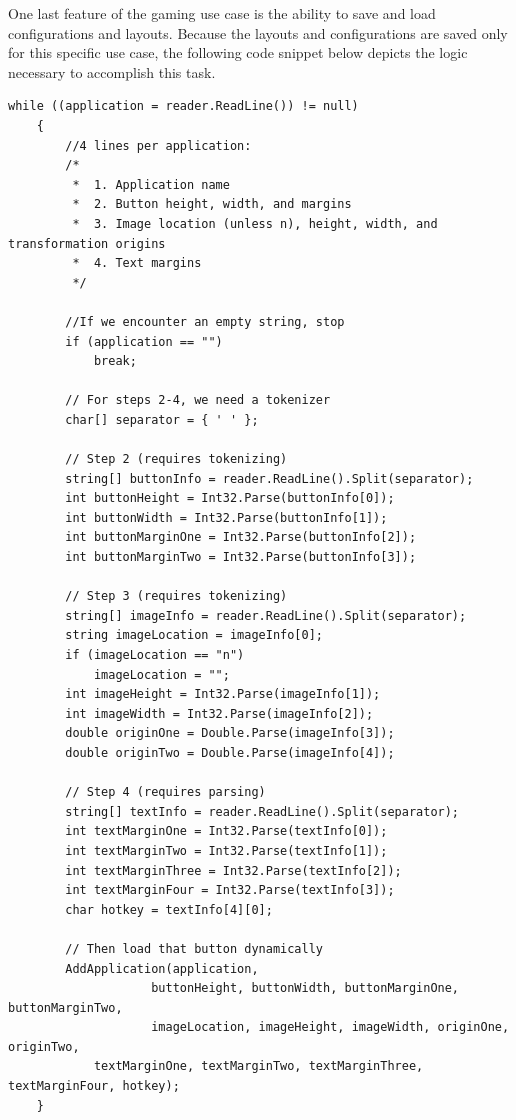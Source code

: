 \documentclass[fullpage, 10pt, onecolumn, draftclsnofoot]{IEEEtran}
\begin{document}
One last feature of the gaming use case is the ability to save and load configurations and layouts.  Because the layouts and configurations are saved only for this specific use case, the following code snippet below depicts the logic necessary to accomplish this task.\\

\lstset{style=sharpc}
\begin{lstlisting}
while ((application = reader.ReadLine()) != null)
    {
        //4 lines per application:
        /*
         *  1. Application name
         *  2. Button height, width, and margins 
         *  3. Image location (unless n), height, width, and transformation origins
         *  4. Text margins
         */

        //If we encounter an empty string, stop
        if (application == "")
            break;

        // For steps 2-4, we need a tokenizer
        char[] separator = { ' ' };

        // Step 2 (requires tokenizing)
        string[] buttonInfo = reader.ReadLine().Split(separator);
        int buttonHeight = Int32.Parse(buttonInfo[0]);
        int buttonWidth = Int32.Parse(buttonInfo[1]);
        int buttonMarginOne = Int32.Parse(buttonInfo[2]);
        int buttonMarginTwo = Int32.Parse(buttonInfo[3]);

        // Step 3 (requires tokenizing)
        string[] imageInfo = reader.ReadLine().Split(separator);
        string imageLocation = imageInfo[0];
        if (imageLocation == "n")
            imageLocation = "";
        int imageHeight = Int32.Parse(imageInfo[1]);
        int imageWidth = Int32.Parse(imageInfo[2]);
        double originOne = Double.Parse(imageInfo[3]);
        double originTwo = Double.Parse(imageInfo[4]);

        // Step 4 (requires parsing)
        string[] textInfo = reader.ReadLine().Split(separator);
        int textMarginOne = Int32.Parse(textInfo[0]);
        int textMarginTwo = Int32.Parse(textInfo[1]);
        int textMarginThree = Int32.Parse(textInfo[2]);
        int textMarginFour = Int32.Parse(textInfo[3]);
        char hotkey = textInfo[4][0];

        // Then load that button dynamically
        AddApplication(application,
                    buttonHeight, buttonWidth, buttonMarginOne, buttonMarginTwo,
                    imageLocation, imageHeight, imageWidth, originOne, originTwo,
            textMarginOne, textMarginTwo, textMarginThree, textMarginFour, hotkey);
    }
\end{lstlisting} 
\end{document}
